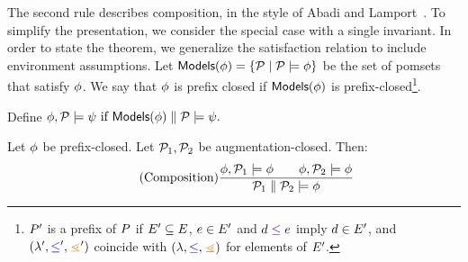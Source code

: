 The second rule describes composition, in the style of Abadi and
Lamport~\cite{Abadi:1993:CS:151646.151649}.  To simplify the presentation, we
consider the special case with a single invariant.
In order to state the theorem, we generalize the satisfaction relation to
include environment assumptions.  Let
\begin{math}
  \textsf{Models}{(\phi)} = \{ \mathcal{P} \mid \mathcal{P} \models \phi \}
\end{math}
be the set of pomsets that satisfy $\phi$.  We say that $\phi$ is prefix
closed if $\textsf{Models}{(\phi)}$ is prefix-closed\footnote{$P'$ is a prefix of
  $P$ if $E'\subseteq E$, $e\in E'$ and $ d\mathrel{{\color{blue}\leq}}e$
  imply $d\in E'$, and $(\labeling',\le',\gtN')$ coincide with
  $(\labeling,\le,\gtN)$ for elements of $E'$.}.
\begin{noenv}
  Define
  \begin{math}
    \phi, \mathcal{P} \models \psi  \text{ if } \textsf{Models}{(\phi)} \parallel \mathcal{P} \models \psi.
  \end{math}
\end{noenv}
\begin{proposition}%
  Let $\phi$ be prefix-closed.  Let $\mathcal{P}_1, \mathcal{P}_2$ be
  augmentation-closed.%
  Then:
  \begin{displaymath}
    \tag{Composition}
    \frac{
      \phi, \mathcal{P}_1 \models\phi
      \qquad
      \phi, \mathcal{P}_2 \models\phi
    }{\mathcal{P}_1 \parallel \mathcal{P}_2 \models \phi}
  \end{displaymath}
\end{proposition}
